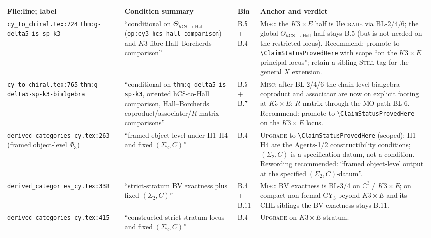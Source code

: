 \documentclass[11pt]{amsart}
\providecommand{\hCS}{h\mathrm{CS}}
\providecommand{\Hall}{\mathrm{Hall}}
\providecommand{\C}{\mathbb{C}}
\begin{document}
\begin{longtable}{@{}p{4.2cm}p{3.5cm}p{1.5cm}p{5cm}@{}}
\toprule
File:line; label & Condition summary & Bin & Anchor and verdict \\
\midrule\endhead

\texttt{cy\_to\_chiral.tex:724} \newline \texttt{thm:g-delta5-is-sp-k3}
& ``conditional on $\Theta_{\hCS\to\Hall}$ (\texttt{op:cy3-hcs-hall-comparison}) and $K3$-fibre Hall--Borcherds comparison''
& B.5 + B.4
& \textsc{Misc}: the $K3 \times E$ half is \textsc{Upgrade} via BL-2/4/6; the global $\Theta_{\hCS\to\Hall}$ half stays B.5 (but is not needed on the restricted locus). Recommend: promote to \texttt{\textbackslash ClaimStatusProvedHere} with scope ``on the $K3 \times E$ principal locus''; retain a sibling \textsc{Still} tag for the general $X$ extension. \\

\texttt{cy\_to\_chiral.tex:765} \newline \texttt{thm:g-delta5-sp-k3-bialgebra}
& ``conditional on \texttt{thm:g-delta5-is-sp-k3}, oriented hCS-to-Hall comparison, Hall--Borcherds coproduct/associator/$R$-matrix comparisons''
& B.5 + B.7
& \textsc{Misc}: after BL-2/4/6 the chain-level bialgebra coproduct and associator are now on explicit footing at $K3 \times E$; $R$-matrix through the MO path BL-6. Recommend: promote to \texttt{\textbackslash ClaimStatusProvedHere} on the $K3 \times E$ locus. \\

\texttt{derived\_categories\_cy.tex:263} \newline (framed object-level $\Phi_3$)
& ``framed object-level under H1--H4 and fixed $(\Sigma_2,C)$''
& B.4
& \textsc{Upgrade} to \texttt{\textbackslash ClaimStatusProvedHere} (scoped): H1--H4 are the Agents-1/2 constructibility conditions; $(\Sigma_2,C)$ is a specification datum, not a condition. Rewording recommended: ``framed object-level output at the specified $(\Sigma_2,C)$-datum''. \\

\texttt{derived\_categories\_cy.tex:338} & ``strict-stratum BV exactness plus fixed $(\Sigma_2,C)$'' & B.4 + B.11 & \textsc{Misc}: BV exactness is BL-3/4 on $\C^3$ / $K3 \times E$; on compact non-formal CY$_3$ beyond $K3\times E$ and its CHL siblings the BV exactness stays B.11. \\

\texttt{derived\_categories\_cy.tex:415} & ``constructed strict-stratum locus and fixed $(\Sigma_2,C)$'' & B.4 & \textsc{Upgrade} on $K3\times E$ stratum. \\


\end{longtable}
\end{document}
